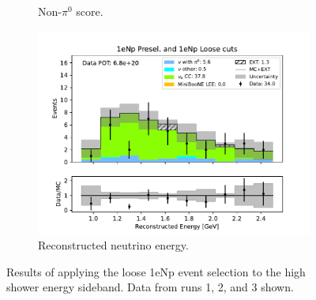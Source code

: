 \begin{figure}[H]
\begin{subfigure}{0.5\linewidth}
        \caption{Non-$\pi^0$ score.}
    \end{subfigure}
    \begin{subfigure}{0.5\linewidth}
        \includegraphics[width=\linewidth]{technote/Sidebands/Figures/ShowerEnergySideband/shr_energy_sideband_reco_e_run123_NP_NPL.pdf}%
        \caption{Reconstructed neutrino energy.}
    \end{subfigure}
    \caption{Results of applying the loose 1eNp event selection to the high shower energy sideband. Data from runs 1, 2, and 3 shown.}
    \label{fig:ShrEnergySideband1eNpRuns123}
\end{figure}

